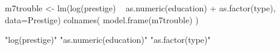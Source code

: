 \begin{Schunk}
\begin{Sinput}
 m7trouble <- lm(log(prestige) ~ as.numeric(education) + as.factor(type), data=Prestige)
 colnames( model.frame(m7trouble) )
\end{Sinput}
\begin{Soutput}
[1] "log(prestige)"         "as.numeric(education)" "as.factor(type)"      
\end{Soutput}
\end{Schunk}
